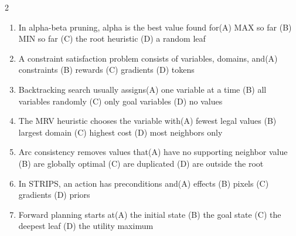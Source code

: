 \documentclass[a4paper]{article}
\begin{document}
\begin{multicols*}{2}
\begin{enumerate}
\item In alpha-beta pruning, alpha is the best value found for\newline\hspace*{0.6em}(A) MAX so far \quad (B) MIN so far \newline\hspace*{0.6em}(C) the root heuristic \quad (D) a random leaf
\item A constraint satisfaction problem consists of variables, domains, and\newline\hspace*{0.6em}(A) constraints \quad (B) rewards \newline\hspace*{0.6em}(C) gradients \quad (D) tokens
\item Backtracking search usually assigns\newline\hspace*{0.6em}(A) one variable at a time \quad (B) all variables randomly \newline\hspace*{0.6em}(C) only goal variables \quad (D) no values
\item The MRV heuristic chooses the variable with\newline\hspace*{0.6em}(A) fewest legal values \quad (B) largest domain \newline\hspace*{0.6em}(C) highest cost \quad (D) most neighbors only
\item Arc consistency removes values that\newline\hspace*{0.6em}(A) have no supporting neighbor value \quad (B) are globally optimal \newline\hspace*{0.6em}(C) are duplicated \quad (D) are outside the root
\item In STRIPS, an action has preconditions and\newline\hspace*{0.6em}(A) effects \quad (B) pixels \newline\hspace*{0.6em}(C) gradients \quad (D) priors
\item Forward planning starts at\newline\hspace*{0.6em}(A) the initial state \quad (B) the goal state \newline\hspace*{0.6em}(C) the deepest leaf \quad (D) the utility maximum

\end{enumerate}
\end{multicols*}
\end{document}
